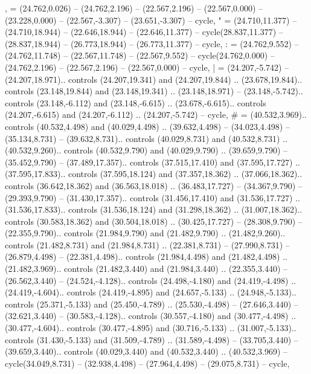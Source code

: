 {,} = {(24.762,0.026) -- (24.762,2.196) -- (22.567,2.196) -- (22.567,0.000) -- (23.228,0.000) -- (22.567,-3.307) -- (23.651,-3.307) -- cycle},
{"} = {(24.710,11.377) -- (24.710,18.944) -- (22.646,18.944) -- (22.646,11.377) -- cycle(28.837,11.377) -- (28.837,18.944) -- (26.773,18.944) -- (26.773,11.377) -- cycle},
{:} = {(24.762,9.552) -- (24.762,11.748) -- (22.567,11.748) -- (22.567,9.552) -- cycle(24.762,0.000) -- (24.762,2.196) -- (22.567,2.196) -- (22.567,0.000) -- cycle},
{|} = {(24.207,-5.742) -- (24.207,18.971).. controls (24.207,19.341) and (24.207,19.844) .. (23.678,19.844).. controls (23.148,19.844) and (23.148,19.341) .. (23.148,18.971) -- (23.148,-5.742).. controls (23.148,-6.112) and (23.148,-6.615) .. (23.678,-6.615).. controls (24.207,-6.615) and (24.207,-6.112) .. (24.207,-5.742) -- cycle},
{\#} = {(40.532,3.969).. controls (40.532,4.498) and (40.029,4.498) .. (39.632,4.498) -- (34.023,4.498) -- (35.134,8.731) -- (39.632,8.731).. controls (40.029,8.731) and (40.532,8.731) .. (40.532,9.260).. controls (40.532,9.790) and (40.029,9.790) .. (39.659,9.790) -- (35.452,9.790) -- (37.489,17.357).. controls (37.515,17.410) and (37.595,17.727) .. (37.595,17.833).. controls (37.595,18.124) and (37.357,18.362) .. (37.066,18.362).. controls (36.642,18.362) and (36.563,18.018) .. (36.483,17.727) -- (34.367,9.790) -- (29.393,9.790) -- (31.430,17.357).. controls (31.456,17.410) and (31.536,17.727) .. (31.536,17.833).. controls (31.536,18.124) and (31.298,18.362) .. (31.007,18.362).. controls (30.583,18.362) and (30.504,18.018) .. (30.425,17.727) -- (28.308,9.790) -- (22.355,9.790).. controls (21.984,9.790) and (21.482,9.790) .. (21.482,9.260).. controls (21.482,8.731) and (21.984,8.731) .. (22.381,8.731) -- (27.990,8.731) -- (26.879,4.498) -- (22.381,4.498).. controls (21.984,4.498) and (21.482,4.498) .. (21.482,3.969).. controls (21.482,3.440) and (21.984,3.440) .. (22.355,3.440) -- (26.562,3.440) -- (24.524,-4.128).. controls (24.498,-4.180) and (24.419,-4.498) .. (24.419,-4.604).. controls (24.419,-4.895) and (24.657,-5.133) .. (24.948,-5.133).. controls (25.371,-5.133) and (25.450,-4.789) .. (25.530,-4.498) -- (27.646,3.440) -- (32.621,3.440) -- (30.583,-4.128).. controls (30.557,-4.180) and (30.477,-4.498) .. (30.477,-4.604).. controls (30.477,-4.895) and (30.716,-5.133) .. (31.007,-5.133).. controls (31.430,-5.133) and (31.509,-4.789) .. (31.589,-4.498) -- (33.705,3.440) -- (39.659,3.440).. controls (40.029,3.440) and (40.532,3.440) .. (40.532,3.969) -- cycle(34.049,8.731) -- (32.938,4.498) -- (27.964,4.498) -- (29.075,8.731) -- cycle},
